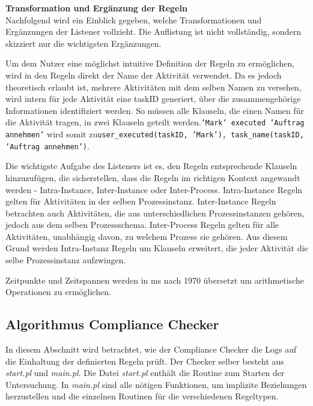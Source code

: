 \textbf{Transformation und Ergänzung der Regeln}\\
Nachfolgend wird ein Einblick gegeben, welche Transformationen und Ergänzungen der Listener vollzieht. Die Auflistung ist nicht vollständig, sondern skizziert nur die wichtigsten Ergänzungen.

Um dem Nutzer eine möglichst intuitive Definition der Regeln zu ermöglichen, wird in den Regeln direkt der Name der Aktivität verwendet. Da es jedoch theoretisch erlaubt ist, mehrere Aktivitäten mit dem selben Namen zu versehen, wird intern für jede Aktivität eine taskID generiert, über die zusammengehörige Informationen identifiziert werden. So müssen alle Klauseln, die einen Namen für die Aktivität tragen, in zwei Klauseln geteilt werden.\newline \texttt{'Mark' executed 'Auftrag annehmen'} wird somit zu\newline \texttt{user\_executed(taskID, 'Mark'), task\_name(taskID, 'Auftrag annehmen')}.

Die wichtigste Aufgabe des Listeners ist es, den Regeln entsprechende Klauseln hinzuzufügen, die sicherstellen, dass die Regeln im richtigen Kontext angewandt werden - Intra-Instance, Inter-Instance oder Inter-Process. Intra-Instance Regeln gelten für Aktivitäten in der selben Prozessinstanz. Inter-Instance Regeln betrachten auch Aktivitäten, die aus unterschiedlichen Prozessinstanzen gehören, jedoch aus dem selben Prozessschema. Inter-Process Regeln gelten für alle Aktivitäten, unabhängig davon, zu welchem Prozess sie gehören. Aus diesem Grund werden Intra-Instanz Regeln um Klauseln erweitert, die jeder Aktivität die selbe Prozessinstanz aufzwingen.

Zeitpunkte und Zeitspannen werden in ms nach 1970 übersetzt um arithmetische Operationen zu ermöglichen.

%
%
\subsection{Algorithmus Compliance Checker}
\label{sec:compliancechecker}
In diesem Abschnitt wird betrachtet, wie der Compliance Checker die Logs auf die Einhaltung der definierten Regeln prüft. Der Checker selber besteht aus \textit{start.pl} und \textit{main.pl}. Die Datei \textit{start.pl} enthält die Routine zum Starten der Untersuchung. In \textit{main.pl} sind alle nötigen Funktionen, um implizite Beziehungen herzustellen und die einzelnen Routinen für die verschiedenen Regeltypen.

